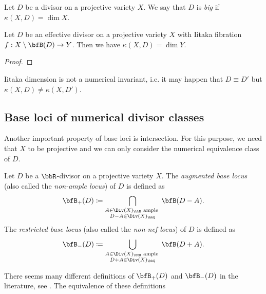   \begin{definition}
    Let $D$ be a divisor on a projective variety $X$.
    We say that $D$ is \emph{big} if $\kappa(X, D) = \dim X$.
  \end{definition} 

  \begin{proposition}
    Let $D$ be an effective divisor on a projective variety $X$ with Iitaka fibration $f: X \setminus \bfB(D) \to Y$.
    Then we have $\kappa(X, D) = \dim Y$.
  \end{proposition}
  \begin{proof}
    \Yang{}
  \end{proof}

  \begin{remark}
    Iitaka dimension is not a numerical invariant, i.e. it may happen that $D \equiv D'$ but $\kappa(X, D) \neq \kappa(X, D')$.
  \end{remark}




    \Yang{}



\subsection{Base loci of numerical divisor classes}

  Another important property of base loci is intersection.
  For this purpose, we need that $X$ to be projective and we can only consider the numerical equivalence class of $D$.


  \begin{definition}
    Let $D$ be a $\bbR$-divisor on a projective variety $X$.
    The \emph{augmented base locus} (also called the \emph{non-ample locus}) of $D$ is defined as
    \[ \bfB_+(D) \coloneqq \bigcap_{\substack{A \in \Div(X)_\bbR \text{ ample } \\ D - A \in \Div(X)_\bbQ}} \bfB(D - A). \]
    The \emph{restricted base locus} (also called the \emph{non-nef locus}) of $D$ is defined as
    \[ \bfB_-(D) \coloneqq \bigcup_{\substack{A \in \Div(X)_\bbR \text{ ample } \\ D + A \in \Div(X)_\bbQ}} \bfB(D + A). \]
  \end{definition}

  \begin{remark}
    There seems many different definitions of $\bfB_+(D)$ and $\bfB_-(D)$ in the literature, see \cite{Birkar-2017-augmented-base-locus,Ein-Lazarsfeld-Mustața-Nakamaye-Popa-2006-asymptotic-invariants-base-loci}.
    The equivalence of these definitions 
  \end{remark}

